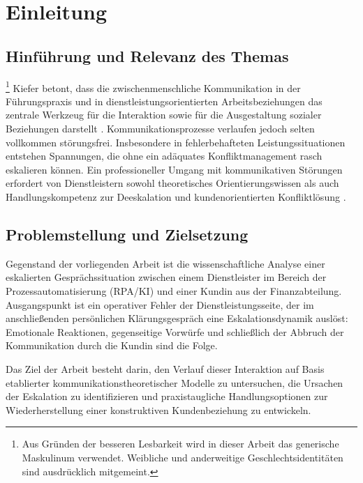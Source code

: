 
\chapter{Einleitung} 
\label{sec:einleitung}

\section{Hinführung und Relevanz des Themas}
\footnote{Aus Gründen der besseren Lesbarkeit wird in dieser Arbeit das generische Maskulinum verwendet. Weibliche und anderweitige Geschlechtsidentitäten sind ausdrücklich mitgemeint.}
Kiefer betont, dass die zwischenmenschliche Kommunikation in der Führungspraxis und in dienstleistungsorientierten Arbeitsbeziehungen das zentrale Werkzeug für die Interaktion sowie für die Ausgestaltung sozialer Beziehungen darstellt \cite[S.~1]{3}. Kommunikationsprozesse verlaufen jedoch selten vollkommen störungsfrei. Insbesondere in fehlerbehafteten Leistungssituationen entstehen Spannungen, die ohne ein adäquates Konfliktmanagement rasch eskalieren können. Ein professioneller Umgang mit kommunikativen Störungen erfordert von Dienstleistern sowohl theoretisches Orientierungswissen als auch Handlungskompetenz zur Deeskalation und kundenorientierten Konfliktlösung \cite[S.~1--4]{5}.

\section{Problemstellung und Zielsetzung}
Gegenstand der vorliegenden Arbeit ist die wissenschaftliche Analyse einer eskalierten Gesprächssituation zwischen einem Dienstleister im Bereich der Prozessautomatisierung (\ac{RPA}/\ac{KI}) und einer Kundin aus der Finanzabteilung. Ausgangspunkt ist ein operativer Fehler der Dienstleistungsseite, der im anschließenden persönlichen Klärungsgespräch eine Eskalationsdynamik auslöst: Emotionale Reaktionen, gegenseitige Vorwürfe und schließlich der Abbruch der Kommunikation durch die Kundin sind die Folge.

Das Ziel der Arbeit besteht darin, den Verlauf dieser Interaktion auf Basis etablierter kommunikationstheoretischer Modelle zu untersuchen, die Ursachen der Eskalation zu identifizieren und praxistaugliche Handlungsoptionen zur Wiederherstellung einer konstruktiven Kundenbeziehung zu entwickeln.

